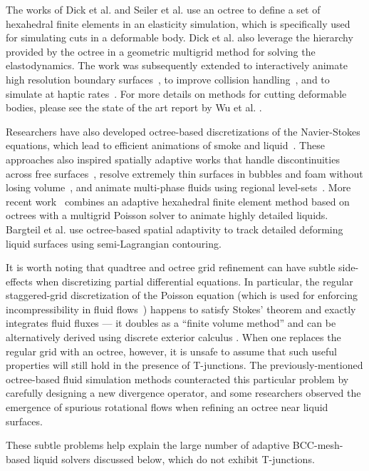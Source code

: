 The works of Dick et al. \cite{Dick2011} and Seiler et al. \cite{Seiler2011} use an octree to define a set of hexahedral finite elements in an elasticity simulation, which is specifically used for simulating cuts in a deformable body. Dick et al. also leverage the hierarchy provided by the octree in a geometric multigrid method for solving the elastodynamics.
The work was subsequently extended to interactively animate high resolution boundary surfaces~\cite{Wu2011}, to improve collision handling~\cite{Wu2013}, and to simulate at haptic rates~\cite{Wu2014}. For more details on methods for cutting deformable bodies, please see the state of the art report by Wu et al. \cite{Wu2014:STAR}.

Researchers have also developed octree-based discretizations of the Navier-Stokes equations, which lead to efficient animations of smoke and liquid~\cite{Shi2004,Losasso2004,Losasso2005}.
These approaches also inspired spatially adaptive works that handle discontinuities across free surfaces~\cite{Hong2005}, resolve extremely thin surfaces in bubbles and foam without losing volume~\cite{Kim2007}, and animate multi-phase fluids using regional level-sets~\cite{Kim2010Multiphase}. More recent work~\cite{Ferstl2014} combines an adaptive hexahedral finite element method based on octrees with a multigrid Poisson solver to animate highly detailed liquids. Bargteil et al. \cite{Bargteil2006} use octree-based spatial adaptivity to track detailed deforming liquid surfaces using semi-Lagrangian contouring.

It is worth noting that quadtree and octree grid refinement can have subtle side-effects when discretizing partial differential equations. In particular, the regular staggered-grid discretization of the Poisson equation (which is used for enforcing incompressibility in fluid flows~\cite{Bridson2008}) happens to satisfy Stokes' theorem and exactly integrates fluid fluxes --- it doubles as a ``finite volume method'' and can be alternatively derived using discrete exterior calculus \cite{Crane:2013:DGP}. When one replaces the regular grid with an octree, however, it is unsafe to assume that such useful properties will still hold in the presence of T-junctions. The previously-mentioned octree-based fluid simulation methods counteracted this particular problem by carefully designing a new divergence operator, and some researchers observed the emergence of spurious rotational flows when refining an octree near liquid surfaces. 

These subtle problems help explain the large number of adaptive BCC-mesh-based liquid solvers discussed below, which do not exhibit T-junctions.

